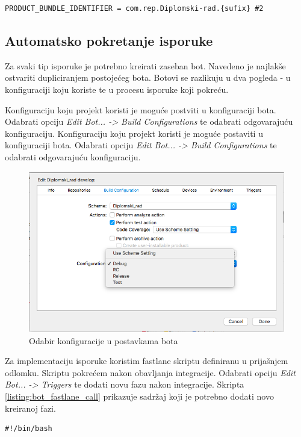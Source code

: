 \documentclass[times, utf8, diplomski, numeric]{fer}
\begin{document}
\begin{appendices}
\begin{lstlisting}[caption=Sadržaj .xcconfig datoteke, label=listing:xcconfig]
PRODUCT_BUNDLE_IDENTIFIER = com.rep.Diplomski-rad.{sufix} #2
\end{lstlisting}

\subsection{Automatsko pokretanje isporuke}

Za svaki tip isporuke je potrebno kreirati zaseban bot. Navedeno je najlakše ostvariti dupliciranjem postojećeg bota. Botovi se razlikuju u dva pogleda - u konfiguraciji koju koriste te u procesu isporuke koji pokreću.

Konfiguraciju koju projekt koristi je moguće postviti u konfiguraciji bota. Odabrati opciju \textit{Edit Bot... -> Build Configurations} te odabrati odgovarajuću konfiguraciju.
Konfiguraciju koju projekt koristi je moguće postaviti u konfiguraciji bota. Odabrati opciju \textit{Edit Bot... -> Build Configurations} te odabrati odgovarajuću konfiguraciju.

\begin{figure}
\centering
\includegraphics[scale=0.5]{BotConfiguration}
\caption{Odabir konfiguracije u postavkama bota}
\label{fig:BotConfiguration}
\end{figure}

Za implementaciju isporuke koristim fastlane skriptu definiranu u prijašnjem odlomku. Skriptu pokrećem nakon obavljanja integracije. Odabrati opciju \textit{Edit Bot... -> Triggers} te dodati novu fazu nakon integracije. Skripta \ref{listing:bot_fastlane_call} prikazuje sadržaj koji je potrebno dodati novo kreiranoj fazi.

\begin{lstlisting}[caption=Sadržaj faze nakon obavljanja isporuke, label=listing:bot_fastlane_call]
#!/bin/bash


\end{lstlisting}
\end{appendices}
\end{document}
